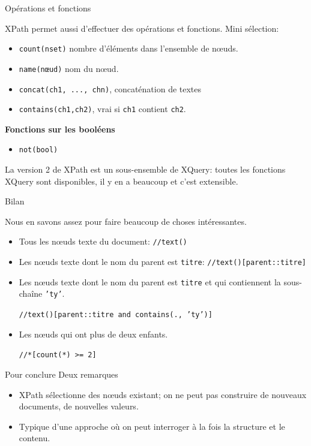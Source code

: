 \begin{frame}[allowframebreaks]{Opérations et fonctions}

XPath permet aussi d'effectuer des opérations et fonctions. Mini sélection:

\begin{itemize}
\item \texttt{count(nset)} nombre d'éléments dans l'ensemble de nœuds. 
\item \texttt{name(nœud)} nom du nœud.
\item \texttt{concat(ch1, ..., chn)}, concaténation de textes
\item \texttt{contains(ch1,ch2)}, vrai si \texttt{ch1} contient \texttt{ch2}.
\end{itemize}


{\bf Fonctions sur les booléens}

\begin{itemize}
\item \texttt{not(bool)}
\end{itemize}

\begin{remark}
La version 2 de XPath est un sous-ensemble de XQuery: toutes les fonctions XQuery
sont disponibles, il y en a beaucoup et c'est extensible.
\end{remark}
\end{frame}



\begin{frame}{Bilan}

Nous en savons assez pour faire beaucoup de choses intéressantes.

\begin{itemize}
  \item Tous les nœuds texte du document: \texttt{//text()}
  \item Les nœuds texte dont le nom du parent est \texttt{titre}:
       \texttt{//text()[parent::titre]}
         \item Les nœuds texte dont le nom du parent est \texttt{titre}
         et qui contiennent la sous-chaîne \texttt{'ty'}.
         
    \texttt{//text()[parent::titre and contains(., 'ty')]}
       
    \item Les nœuds qui ont plus de deux enfants.
    
      \texttt{//*[count(*) >= 2]} 
       
\end{itemize}

\begin{block}{Pour conclure}
Deux remarques
\begin{itemize}
  \item XPath sélectionne des nœuds existant; on ne peut pas construire de nouveaux documents,
      de nouvelles valeurs.
   \item Typique d'une approche où on peut interroger à la fois la structure et le contenu.   
\end{itemize}
\end{block}

\end{frame}
